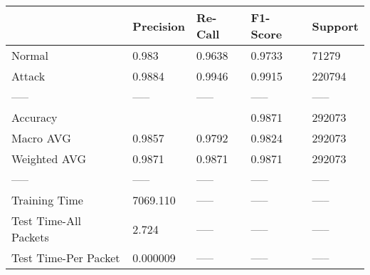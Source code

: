 \begin{tabular}{lllll}
\toprule
{} & Precision & Re-Call & F1-Score & Support \\
\midrule
Normal                &     0.983 &  0.9638 &   0.9733 &   71279 \\
Attack                &    0.9884 &  0.9946 &   0.9915 &  220794 \\
-----                 &     ----- &   ----- &    ----- &   ----- \\
Accuracy              &           &         &   0.9871 &  292073 \\
Macro AVG             &    0.9857 &  0.9792 &   0.9824 &  292073 \\
Weighted AVG          &    0.9871 &  0.9871 &   0.9871 &  292073 \\
-----                 &     ----- &   ----- &    ----- &   ----- \\
Training Time         &  7069.110 &   ----- &    ----- &   ----- \\
Test Time-All Packets &     2.724 &   ----- &    ----- &   ----- \\
Test Time-Per Packet  &  0.000009 &   ----- &    ----- &   ----- \\
\bottomrule
\end{tabular}
